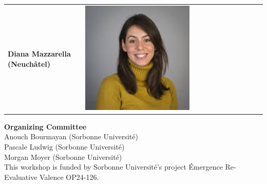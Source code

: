 \documentclass[a4paper,12pt]{article}
\begin{document}
\begin{tcolorbox}
\begin{center}
\begin{minipage}{0.9\textwidth}
\begin{tabular}{@{}>{\raggedleft\arraybackslash}m{0.3\linewidth}@{}>{\centering\arraybackslash}m{0.7\linewidth}@{}}
    \color{Blue}\textbf{Diana Mazzarella (Neuchâtel)} & 
    \includegraphics[width=0.33\linewidth]{../images/diana.jpeg} \\
\end{tabular}

\end{minipage}
\end{center}
\end{tcolorbox}

\bigskip

\centering
\large
\noindent \color{Blue}\textbf{Organizing Committee}\\
\color{black}
  \noindent Anouch Bourmayan (Sorbonne Université)\\
  \noindent Pascale Ludwig (Sorbonne Université)\\
  \noindent Morgan Moyer (Sorbonne Université)\\

\bigskip
This workshop is funded by Sorbonne Université's project Émergence Re-Evaluative Valence OP24-126.


\end{document}
